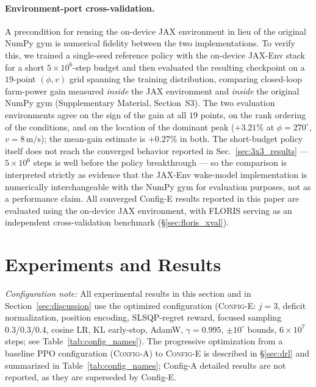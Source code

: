 \documentclass[final,5p,times]{elsarticle}
\begin{document}


\paragraph{Environment-port cross-validation.} A precondition for reusing the on-device JAX environment in lieu of the original NumPy gym is numerical fidelity between the two implementations. To verify this, we trained a single-seed reference policy with the on-device JAX-Env stack for a short $5\!\times\!10^{6}$-step budget and then evaluated the resulting checkpoint on a $19$-point $(\phi,v)$ grid spanning the training distribution, comparing closed-loop farm-power gain measured \emph{inside} the JAX environment and \emph{inside} the original NumPy gym (Supplementary Material, Section~S3). The two evaluation environments agree on the sign of the gain at all $19$ points, on the rank ordering of the conditions, and on the location of the dominant peak ($+3.21\%$ at $\phi\!=\!270^\circ$, $v\!=\!8\,\mathrm{m/s}$); the mean-gain estimate is $+0.27\%$ in both. The short-budget policy itself does not reach the converged behavior reported in Sec.~\ref{sec:3x3_results} --- $5\!\times\!10^{6}$ steps is well before the policy breakthrough --- so the comparison is interpreted strictly as evidence that the JAX-Env wake-model implementation is numerically interchangeable with the NumPy gym for evaluation purposes, not as a performance claim. All converged Config-E results reported in this paper are evaluated using the on-device JAX environment, with FLORIS serving as an independent cross-validation benchmark (\S\ref{sec:floris_xval}).



\section{Experiments and Results}\label{sec:experiments}

{\small\emph{Configuration note:} All experimental results in this section and in Section~\ref{sec:discussion} use the optimized configuration (\textsc{Config-E}: $j{=}3$, deficit normalization, position encoding, SLSQP-regret reward, focused sampling 0.3/0.3/0.4, cosine LR, KL early-stop, AdamW, $\gamma{=}0.995$, $\pm10^\circ$ bounds, $6{\times}10^{7}$ steps; see Table~\ref{tab:config_names}). The progressive optimization from a baseline PPO configuration (\textsc{Config-A}) to \textsc{Config-E} is described in \S\ref{sec:drl} and summarized in Table~\ref{tab:config_names}; Config-A detailed results are not reported, as they are superseded by Config-E.}\medskip
\end{document}
